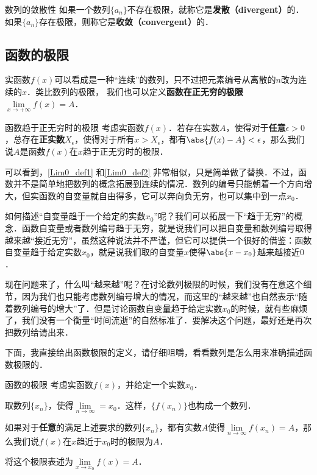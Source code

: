 \begin{definition}{数列的敛散性}\label{Lim0_def4}
如果一个数列$\{a_n\}$不存在极限，就称它是\textbf{发散（divergent）}的．如果$\{a_n\}$存在极限，则称它是\textbf{收敛（convergent）}的．
\end{definition}

\subsection{函数的极限}
实函数$f(x)$可以看成是一种“连续”的数列，只不过把元素编号从离散的$n$改为连续的$x$．类比数列的极限， 我们也可以定义\textbf{函数在正无穷的极限} $\lim\limits_{x\to +\infty} f(x) = A$．

\begin{definition}{函数趋于正无穷时的极限}\label{Lim0_def1}
考虑实函数$f(x)$．若存在实数$A$，使得对于\textbf{任意}$\epsilon>0$，总存在\textbf{正实数}$X_\epsilon$，使得对于所有$x>X_\epsilon$，都有$\abs{f(x)-A}<\epsilon$，那么我们说$A$是函数$f(x)$在$x$趋于正无穷时的极限．
\end{definition}

可以看到，\autoref{Lim0_def1} 和\autoref{Lim0_def2} 非常相似，只是简单做了替换．不过，函数并不是简单地把数列的概念拓展到连续的情况．数列的编号只能朝着一个方向增大，但实函数的自变量就自由得多，它可以奔向负无穷，也可以集中到一点$x_0$．

如何描述“自变量趋于一个给定的实数$x_0$”呢？我们可以拓展一下“趋于无穷”的概念．函数自变量或者数列编号趋于无穷，就是说我们可以把自变量和数列编号取得越来越“接近无穷”，虽然这种说法并不严谨，但它可以提供一个很好的借鉴：函数自变量趋于给定实数$x_0$，就是说我们取的自变量$x$使得$\abs{x-x_0}$越来越接近$0$．

现在问题来了，什么叫“越来越”呢？在讨论数列极限的时候，我们没有在意这个细节，因为我们也只能考虑数列编号增大的情况，而这里的“越来越”也自然表示“随着数列编号的增大”了．但是讨论函数自变量趋于给定实数$x_0$的时候，就有些麻烦了，我们没有一个衡量“时间流逝”的自然标准了．要解决这个问题，最好还是再次把数列给请出来．

下面，我直接给出函数极限的定义，请仔细咀嚼，看看数列是怎么用来准确描述函数极限的．

\begin{definition}{函数的极限}\label{Lim0_def3}
考虑实函数$f(x)$，并给定一个实数$x_0$．

取数列$\{x_n\}$，使得$\lim\limits_{n\to\infty}=x_0$．这样，$\{f(x_n)\}$也构成一个数列．

如果对于\textbf{任意}的满足上述要求的数列$\{x_n\}$，都有实数$A$使得$\lim\limits_{n\to\infty}f(x_n)=A$，那么我们说$f(x)$在$x$趋近于$x_0$时的极限为$A$．

将这个极限表述为$\lim\limits_{x\to x_0}f(x)=A$．
\end{definition}

